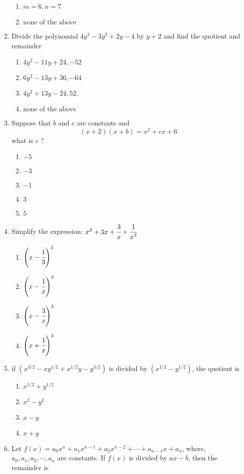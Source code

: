 \begin{multicols}{2}
\begin{enumerate}[label={\arabic*.}]
\begin{enumerate}[label={\Alph*.}]
	\item \(m = 6, n = 7\)
	\item \( \text{none of the above}\)
	\end{enumerate}
\item Divide the polynomial $4y^3 - 3y^2 + 2y -4 $ by $y + 2$ and find the quotient and remainder 
	\begin{enumerate}[label={\Alph*.}]
	\item \(4y^2 - 11y + 24, -52\)
	\item \(6y^2 - 13y + 36 , -64\)
	\item \(4y^2 + 13y - 24, 52, \)
	\item \(\text{none of the above}\)
	\end{enumerate}
\item Suppose that $b$ and $c$ are constants and $$(x+2)(x+b) = x^2 + cx + 6$$ what is $c$ ?
	\begin{enumerate}[label={\Alph*.}]
	\item \(-5\)
	\item \(-3\)
	\item \(-1\)
	\item \(3\)
	\item \(5\)
	\end{enumerate}
\item Simplify the expression: $x^3 + 3x + \cfrac{3}{x} + \cfrac{1}{x^3}$
\begin{multicols}{2}
	\begin{enumerate}[label={\Alph*.}]
	\item \(\left(x - \cfrac{1}{3}\right)^3\)
	\item \(\left(x - \cfrac{1}{x}\right)^3\)
	\item \(\left(x - \cfrac{3}{x}\right)^3\)
	\item \(\left(x + \cfrac{1}{x}\right)^3\)
	\end{enumerate}
\end{multicols}
\item if $(x^{3/2} - xy^{1/2} + x^{1/2}y - y^{3/2})$ is divided by $(x^{1/2} - y^{1/2})$, the quotient is 
\begin{enumerate}[label={\Alph*.}]
	\item \(x^{1/2} + y^{1/2}\)
	\item \(x^2 - y^2\)
	\item \(x-y\)
	\item \(x+y\)
	\end{enumerate}
\item Let $f(x) = a_{0}x^{n} + a_{1}x^{n-1} + a_{2}x^{n-2} + \cdots + a_{n-1}x + a_{n}$, where, $a_{0}, a_{1}, a_{2}, \cdots, a_{n}$ are constants. If $f(x)$ is divided by $ax -b$, then the remainder is

\end{enumerate}
\end{multicols}
